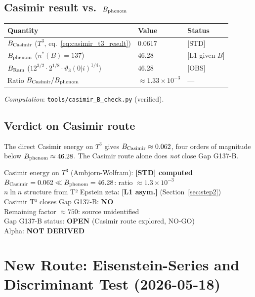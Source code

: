 \documentclass[12pt,a4paper]{article}
\begin{document}
\subsection{Casimir result vs.\ $B_{\rm phenom}$}

\begin{center}
\begin{tabular}{lll}
\toprule
Quantity & Value & Status \\
\midrule
$B_{\rm Casimir}$ ($T^3$, eq.~\ref{eq:casimir_t3_result}) & $0.0617$ & [STD] \\
$B_{\rm phenom}$ ($n^*(B)\!=\!137$) & $46.28$ & [L1 given $B$] \\
$B_{\rm Ram}$ ($12^{3/2}\cdot 2^{1/8}\cdot\vartheta_3(0|i)^{1/4}$) & $46.28$ & [OBS] \\
Ratio $B_{\rm Casimir}/B_{\rm phenom}$ & $\approx 1.33 \times 10^{-3}$ & --- \\
\bottomrule
\end{tabular}
\end{center}

\textit{Computation}: \texttt{tools/casimir\_B\_check.py} (verified).

\subsection{Verdict on Casimir route}

The direct Casimir energy on $T^3$ gives $B_{\rm Casimir} \approx 0.062$,
four orders of magnitude below $B_{\rm phenom} \approx 46.28$.
The Casimir route alone does \emph{not} close Gap G137-B.

\begin{statusbox}
Casimir energy on $T^3$ (Ambjorn-Wolfram): \textbf{[STD] computed}\\
$B_{\rm Casimir} = 0.062 \ll B_{\rm phenom} = 46.28$: ratio $\approx 1.3\times10^{-3}$\\
$n\ln n$ structure from T² Epstein zeta: \textbf{[L1 asym.]} (Section~\ref{sec:step2})\\
Casimir T³ closes Gap G137-B: \textbf{NO}\\
Remaining factor $\approx 750$: source unidentified\\
Gap G137-B status: \textbf{OPEN} (Casimir route explored, NO-GO)\\
Alpha: \textbf{NOT DERIVED}
\end{statusbox}

\section{New Route: Eisenstein-Series and Discriminant Test (2026-05-18)}
\label{sec:eisenstein}
\end{document}
